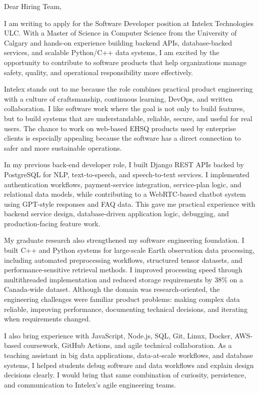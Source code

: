 \documentclass[11pt]{letter}
\begin{document}
\begin{letter}{}

\opening{Dear Hiring Team,}

I am writing to apply for the Software Developer position at Intelex Technologies ULC. With a Master of Science in Computer Science from the University of Calgary and hands-on experience building backend APIs, database-backed services, and scalable Python/C++ data systems, I am excited by the opportunity to contribute to software products that help organizations manage safety, quality, and operational responsibility more effectively.

Intelex stands out to me because the role combines practical product engineering with a culture of craftsmanship, continuous learning, DevOps, and written collaboration. I like software work where the goal is not only to build features, but to build systems that are understandable, reliable, secure, and useful for real users. The chance to work on web-based EHSQ products used by enterprise clients is especially appealing because the software has a direct connection to safer and more sustainable operations.

In my previous back-end developer role, I built Django REST APIs backed by PostgreSQL for NLP, text-to-speech, and speech-to-text services. I implemented authentication workflows, payment-service integration, service-plan logic, and relational data models, while contributing to a WebRTC-based chatbot system using GPT-style responses and FAQ data. This gave me practical experience with backend service design, database-driven application logic, debugging, and production-facing feature work.

My graduate research also strengthened my software engineering foundation. I built C++ and Python systems for large-scale Earth observation data processing, including automated preprocessing workflows, structured tensor datasets, and performance-sensitive retrieval methods. I improved processing speed through multithreaded implementation and reduced storage requirements by 38\% on a Canada-wide dataset. Although the domain was research-oriented, the engineering challenges were familiar product problems: making complex data reliable, improving performance, documenting technical decisions, and iterating when requirements changed.

I also bring experience with JavaScript, Node.js, SQL, Git, Linux, Docker, AWS-based coursework, GitHub Actions, and agile technical collaboration. As a teaching assistant in big data applications, data-at-scale workflows, and database systems, I helped students debug software and data workflows and explain design decisions clearly. I would bring that same combination of curiosity, persistence, and communication to Intelex's agile engineering teams.


\end{letter}
\end{document}
